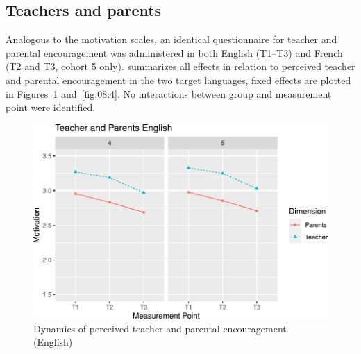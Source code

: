 \documentclass[output=paper]{langsci/langscibook}
\begin{document}
\subsection{Teachers and parents}

Analogous to the motivation scales, an identical questionnaire for teacher and parental encouragement was administered in both English (T1--T3) and French (T2 and T3, cohort 5 only).   summarizes all effects in relation to perceived teacher and parental encouragement in the two target languages, fixed effects are plotted in Figures~\ref{fig:08:3}  and~\ref{fig:08:4}. No interactions between group and measurement point were identified.


\begin{table}
\caption{Fixed and random effects for perceived teacher and parental encouragement\label{tab:08:4}. EN: English, FR: French, TE: Teacher encouragement, PE: Parental encouragement, Int: Intercept.}
\end{table}

  
\begin{figure}
\includegraphics[width=\textwidth]{figures/Fig8.3.pdf}
\caption{Dynamics of perceived teacher and parental encouragement (English)\label{fig:08:3}}
\end{figure}
\end{document}
